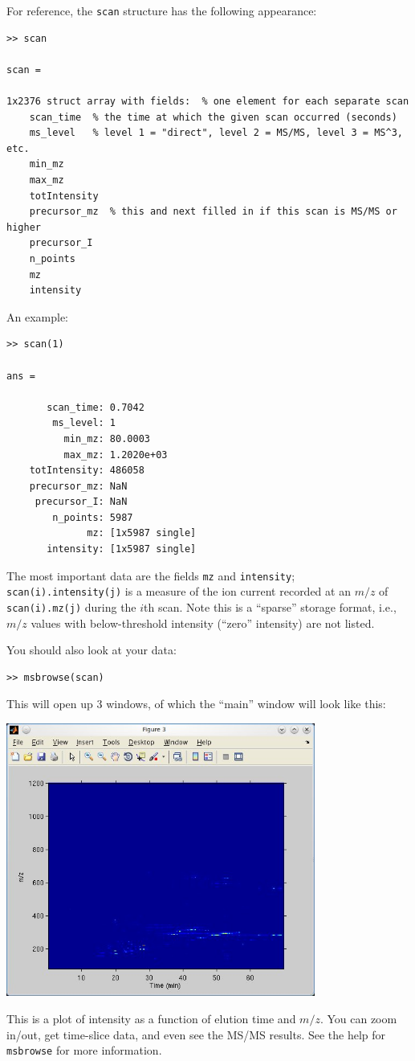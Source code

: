 \documentclass[notitlepage]{revtex4-1}
\begin{document}
For reference, the \verb|scan| structure has the following appearance:
\begin{verbatim}
>> scan

scan = 

1x2376 struct array with fields:  % one element for each separate scan
    scan_time  % the time at which the given scan occurred (seconds)
    ms_level   % level 1 = "direct", level 2 = MS/MS, level 3 = MS^3, etc.
    min_mz
    max_mz
    totIntensity
    precursor_mz  % this and next filled in if this scan is MS/MS or higher
    precursor_I
    n_points
    mz
    intensity
\end{verbatim}
An example:
\begin{verbatim}
>> scan(1)

ans = 

       scan_time: 0.7042
        ms_level: 1
          min_mz: 80.0003
          max_mz: 1.2020e+03
    totIntensity: 486058
    precursor_mz: NaN
     precursor_I: NaN
        n_points: 5987
              mz: [1x5987 single]
       intensity: [1x5987 single]
\end{verbatim}
The most important data are the fields \verb|mz| and \verb|intensity|; \verb|scan(i).intensity(j)| is a measure of the ion current recorded at an $m/z$ of \verb|scan(i).mz(j)| during the $i$th scan.  Note this is a ``sparse'' storage format, i.e., $m/z$ values with below-threshold intensity (``zero'' intensity) are not listed.

You should also look at your data:
\begin{verbatim}
>> msbrowse(scan)
\end{verbatim}
This will open up 3 windows, of which the ``main'' window will look like this:
\begin{center}
\includegraphics[width=4in]{figures/browse_mainwindow}
\end{center}
This is a plot of intensity as a function of elution time and $m/z$.  You can zoom in/out, get time-slice data, and even see the MS/MS results.  See the help for \verb|msbrowse| for more information.
\end{document}
